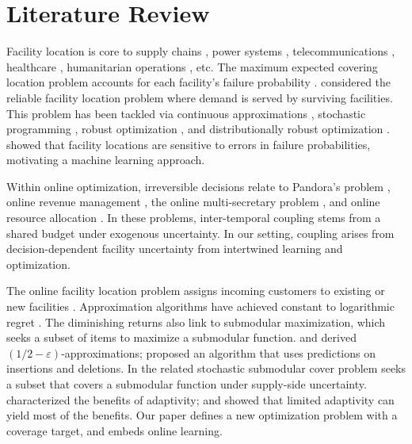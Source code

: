 \documentclass[nonblindrev]{informs3noheader}
\begin{document}
\section{Literature Review}

Facility location is core to supply chains \citep{daskin1997network}, power systems \citep{qi2015joint}, telecommunications \citep{bardossy2010dual}, healthcare \citep{bertsimas2022locate,jacquillat2024branch}, humanitarian operations \citep{bayram2018shelter}, etc. The maximum expected covering location problem accounts for each facility's failure probability \citep{daskin1983maximum}. \citet{snyder2005reliability} considered the reliable facility location problem  where demand is served by surviving facilities. This problem has been tackled via continuous approximations \citep{cui2010reliable}, stochastic programming \citep{laporte1994exact,shen2011reliable}, robust optimization \citep{cheng2021robust}, and distributionally robust optimization \citep{lu2015reliable}. \cite{lim2013facility} showed that facility locations are sensitive to errors in failure probabilities, motivating a machine learning approach.

Within online optimization, irreversible decisions relate to Pandora's problem \citep{brown2024sequential}, online revenue management \citep{jasin2012re,bumpensanti2020re}, the online multi-secretary problem \citep{arlotto2019uniformly}, and online resource allocation \citep{vera2021bayesian,banerjee2019good,baxi2024online}. In these problems, inter-temporal coupling stems from a shared budget under exogenous uncertainty. In our setting, coupling arises from decision-dependent facility uncertainty from intertwined learning and optimization.

The online facility location problem assigns incoming customers to existing or new facilities \citep{fotakis2011online}. Approximation algorithms have achieved constant to logarithmic regret  \citep[e.g.,][]{meyerson2001online,fotakis2008competitive,guo2020facility}. The diminishing returns also link to submodular maximization, which seeks a subset of items to maximize a submodular function.  \cite{lattanzi2020fully} and \cite{monemizadeh2020dynamic} derived $(1/2-\varepsilon)$-approximations; \cite{agarwal2023learning} proposed an algorithm that uses predictions on insertions and deletions. In the related stochastic submodular cover problem seeks a subset that covers a submodular function under supply-side uncertainty. \cite{goemans2006stochastic} characterized the benefits of adaptivity; \cite{agarwal2019stochastic} and \cite{ghuge2022power} showed that limited adaptivity can yield most of the benefits. Our paper defines a new optimization problem with a coverage target, and embeds online learning.
\end{document}
